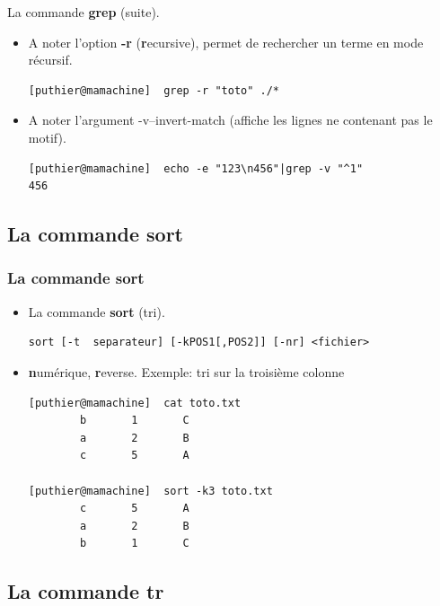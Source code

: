 \documentclass[10pt, xcolor=dvipsnames]{beamer}
\begin{document}
\begin{frame}[fragile]

La commande \textbf{grep} (suite).

     \begin{itemize}
        \item A noter l'option \textbf{-r} (\textbf{r}ecursive), permet de rechercher un terme en mode récursif.
        \begin{verbatim}
[puthier@mamachine]  grep -r "toto" ./*
        \end{verbatim}
        \item A noter l'argument -v--invert-match (affiche les lignes ne contenant pas le motif).
        \begin{verbatim}
[puthier@mamachine]  echo -e "123\n456"|grep -v "^1"
456
        \end{verbatim}
    \end{itemize}

\end{frame}


\subsection{La commande sort}
\begin{frame}[fragile]
\frametitle{La commande sort}
    \begin{itemize}
        \item La commande \textbf{sort} (tri).

             \begin{verbatim}
sort [-t  separateur] [-kPOS1[,POS2]] [-nr] <fichier>
             \end{verbatim}

        \item \textbf{n}umérique, \textbf{r}everse. Exemple: tri sur la troisième colonne


             \begin{verbatim}
[puthier@mamachine]  cat toto.txt
        b       1       C
        a       2       B
        c       5       A

[puthier@mamachine]  sort -k3 toto.txt
        c       5       A
        a       2       B
        b       1       C
             \end{verbatim}
    \end{itemize}

\end{frame}

\subsection{La commande tr}
\end{document}
